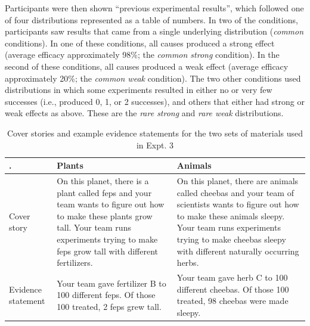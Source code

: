 \documentclass[english,,man,floatsintext]{apa6}
\theoremstyle{definition}
\theoremstyle{definition}
\theoremstyle{definition}
\theoremstyle{remark}
\begin{document}
Participants were then shown \enquote{previous experimental results},
which followed one of four distributions represented as a table of
numbers. In two of the conditions, participants saw results that came
from a single underlying distribution (\emph{common} conditions). In one
of these conditions, all causes produced a strong effect (average
efficacy approximately 98\%; the \emph{common strong} condition). In the
second of these conditions, all causes produced a weak effect (average
efficacy approximately 20\%; the \emph{common weak} condition). The two
other conditions used distributions in which some experiments resulted
in either no or very few successes (i.e., produced 0, 1, or 2
successes), and others that either had strong or weak effects as above.
These are the \emph{rare strong} and \emph{rare weak} distributions.

\begin{table}[ht]
\centering
\begingroup\fontsize{9pt}{10pt}\selectfont
\begin{tabular}{ |p{1.75in}|p{2in}|p{2in} |}
  \hline
{\bfseries .} & {\bfseries Plants} & {\bfseries Animals} \\ 
  \hline
Cover story & On this planet, there is a plant called feps and your team wants to figure out how to make these plants grow tall. Your team runs experiments trying to make feps grow tall with different fertilizers. & On this planet, there are animals called cheebas and your team of scientists wants to figure out how to make these animals sleepy. Your team runs experiments trying to make cheebas sleepy with different naturally occurring herbs. \\ 
   \hline
Evidence statement & Your team gave fertilizer B to 100 different feps. Of those 100 treated, 2 feps grew tall. & Your team gave herb C to 100 different cheebas. Of those 100 treated, 98 cheebas were made sleepy. \\ 
   \hline
\end{tabular}
\endgroup
\caption{Cover stories and example evidence statements for the two sets of materials used in Expt. 3} 
\end{table}
\end{document}
